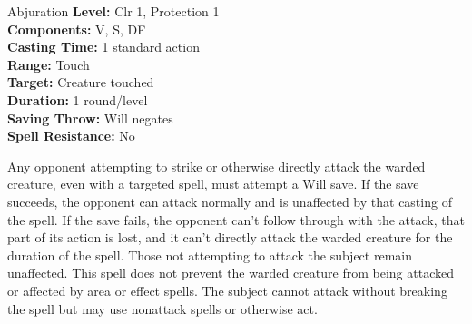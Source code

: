 {Abjuration}
{
	\textbf{Level:}
	Clr 1, Protection 1\\
	\textbf{Components:}
	V, S, DF\\
	\textbf{Casting Time:}
	1 standard action\\
	\textbf{Range:}
	Touch\\
	\textbf{Target:}
	Creature touched\\
	\textbf{Duration:}
	1 round/level\\
	\textbf{Saving Throw:}
	Will negates\\
	\textbf{Spell Resistance:}
	No\\
}
{
	Any opponent attempting to strike or otherwise directly attack the warded creature, even with a targeted spell, must attempt a Will save. If the save succeeds, the opponent can attack normally and is unaffected by that casting of the spell. If the save fails, the opponent can't follow through with the attack, that part of its action is lost, and it can't directly attack the warded creature for the duration of the spell. Those not attempting to attack the subject remain unaffected. This spell does not prevent the warded creature from being attacked or affected by area or effect spells. The subject cannot attack without breaking the spell but may use nonattack spells or otherwise act.

}
